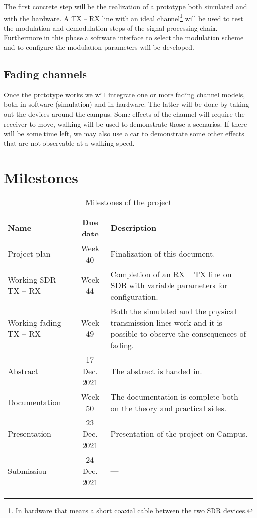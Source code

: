 \documentclass[a4paper, twosided, 11pt]{scrartcl}
\begin{document}
The first concrete step will be the realization of a prototype both simulated and with the hardware.
A TX -- RX line with an ideal channel\footnote{In hardware that means a short coaxial cable between the two SDR devices.} will be used to test the modulation and demodulation steps of the signal processing chain.
Furthermore in this phase a software interface to select the modulation scheme and to configure the modulation parameters will be developed.

\subsection{Fading channels}

Once the prototype works we will integrate one or more fading channel models, both in software (simulation) and in hardware.
The latter will be done by taking out the devices around the campus.
Some effects of the channel will require the receiver to move, walking will be used to demonstrate those a scenarios.
If there will be some time left, we may also use a car to demonstrate some other effects that are not observable at a walking speed.

\clearpage

\section{Milestones}

\begin{table}[h]
	\centering
	\caption{Milestones of the project}
	\renewcommand\arraystretch{1.2}
	\begin{tabularx}{\linewidth}{l c X}
		\toprule
		\bfseries Name & \bfseries Due date & \bfseries Description \\
		\midrule
		Project plan & Week 40 & 
			Finalization of this document. \\

		Working SDR TX -- RX  & Week 44 &
			Completion of an RX -- TX line on SDR with variable parameters for configuration. \\

		Working fading TX -- RX & Week 49 &
			Both the simulated and the physical transmission lines work and it is possible to observe the consequences of fading.\\
			
		Abstract & 17 Dec. 2021 &
			The abstract is handed in. \\

		Documentation & Week 50 &
			The documentation is complete both on the theory and practical sides. \\

		Presentation & 23 Dec. 2021 &
			Presentation of the project on Campus. \\
		Submission & 24 Dec. 2021 & --- \\
		\bottomrule
	\end{tabularx}
\end{table}
\end{document}
